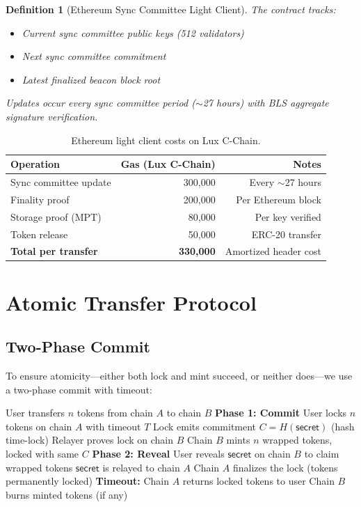\documentclass[11pt,a4paper]{article}
\newtheorem{definition}{Definition}
\begin{document}
\begin{definition}[Ethereum Sync Committee Light Client]
The contract tracks:
\begin{itemize}
    \item Current sync committee public keys (512 validators)
    \item Next sync committee commitment
    \item Latest finalized beacon block root
\end{itemize}
Updates occur every sync committee period ($\sim$27 hours) with BLS aggregate signature verification.
\end{definition}

\begin{table}[H]
\centering
\caption{Ethereum light client costs on Lux C-Chain.}
\label{tab:eth_lc}
\begin{tabular}{lrr}
\toprule
\textbf{Operation} & \textbf{Gas (Lux C-Chain)} & \textbf{Notes} \\
\midrule
Sync committee update & 300,000 & Every $\sim$27 hours \\
Finality proof & 200,000 & Per Ethereum block \\
Storage proof (MPT) & 80,000 & Per key verified \\
Token release & 50,000 & ERC-20 transfer \\
\midrule
\textbf{Total per transfer} & \textbf{330,000} & Amortized header cost \\
\bottomrule
\end{tabular}
\end{table}

\section{Atomic Transfer Protocol}\label{sec:atomic}

\subsection{Two-Phase Commit}

To ensure atomicity---either both lock and mint succeed, or neither does---we use a two-phase commit with timeout:

\begin{algorithm}[H]
\caption{Atomic Interchain Transfer}
\label{alg:atomic}
\begin{algorithmic}[1]
\Require User transfers $n$ tokens from chain $A$ to chain $B$
\State \textbf{Phase 1: Commit}
\State User locks $n$ tokens on chain $A$ with timeout $T$
\State Lock emits commitment $C = H(\mathsf{secret})$ (hash time-lock)
\State Relayer proves lock on chain $B$
\State Chain $B$ mints $n$ wrapped tokens, locked with same $C$
\State \textbf{Phase 2: Reveal}
\State User reveals $\mathsf{secret}$ on chain $B$ to claim wrapped tokens
\State $\mathsf{secret}$ is relayed to chain $A$
\State Chain $A$ finalizes the lock (tokens permanently locked)
\State \textbf{Timeout:}
    \State Chain $A$ returns locked tokens to user
    \State Chain $B$ burns minted tokens (if any)
\EndIf
\end{algorithmic}
\end{algorithm}
\end{document}
